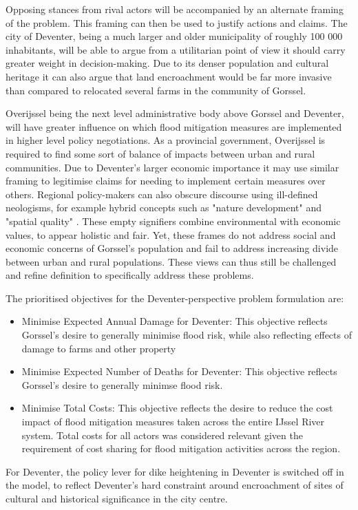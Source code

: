 Opposing stances from rival actors will be accompanied by an alternate framing of the problem. This framing can then be used to justify actions and claims. The city of Deventer, being a much larger and older municipality of roughly 100 000 inhabitants, will be able to argue from a utilitarian point of view it should carry greater weight in decision-making. Due to its denser population and cultural heritage it can also argue that land encroachment would be far more invasive than compared to relocated several farms in the community of Gorssel. 

Overijssel being the next level administrative body above Gorssel and Deventer, will have greater influence on which flood mitigation measures are implemented in higher level policy negotiations. As a provincial government, Overijssel is required to find some sort of balance of impacts between urban and rural communities. Due to Deventer's larger economic importance it may use similar framing to legitimise claims for needing to implement certain measures over others. Regional policy-makers can also obscure discourse using ill-defined neologisms, for example hybrid concepts such as "nature development" and "spatial quality" \parencite{warner_implementing_2011}. These empty signifiers combine environmental with economic values, to appear holistic and fair. Yet, these frames do not address social and economic concerns of Gorssel's population and fail to address increasing divide between urban and rural populations. These views can thus still be challenged and refine definition to specifically address these problems.


The prioritised objectives for the Deventer-perspective problem formulation are:
\begin{itemize}
    \item Minimise Expected Annual Damage for Deventer: This objective reflects Gorssel's desire to generally minimise flood risk, while also reflecting effects of damage to farms and other property
    \item Minimise Expected Number of Deaths for Deventer: This objective reflects Gorssel's desire to generally minimse flood risk.
    \item Minimise Total Costs: This objective reflects the desire to reduce the cost impact of flood mitigation measures taken across the entire IJssel River system. Total costs for all actors was considered relevant given the requirement of cost sharing for flood mitigation activities across the region.
\end{itemize}
For Deventer, the policy lever for dike heightening in Deventer is switched off in the model, to reflect Deventer's hard constraint around encroachment of sites of cultural and historical significance in the city centre.

